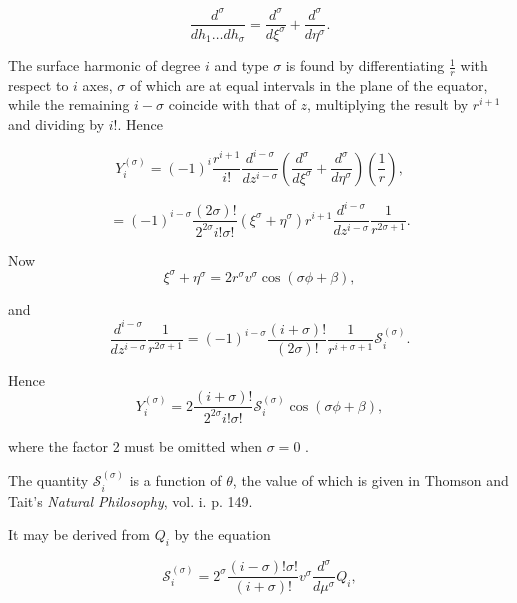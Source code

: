 \documentclass[11pt,a4paper]{article}
\begin{document}
\begin{equation}\tag{32}
\frac{d^\sigma}{dh_1\ldots dh_\sigma}=\frac{d^\sigma}{d\xi^\sigma}+\frac{d^\sigma}{d\eta^\sigma}.
\end{equation}

The surface harmonic of degree $i$ and type $\sigma$ is found by differentiating $\frac{1}{r}$ with respect to $i$ axes, $\sigma$ of which are at equal intervals in the plane of the equator, while the remaining $i-\sigma$ coincide with that of $z$, multiplying the result by $r^{i+1}$ and dividing by $i!$. Hence

\begin{equation}\tag{33}
Y_i^{(\sigma)}=(-1)^i\frac{r^{i+1}}{i!}\frac{d^{i-\sigma}}{dz^{i-\sigma}}
\left(\frac{d^\sigma}{d\xi^\sigma}+\frac{d^\sigma}{d\eta^\sigma}\right)\left(\frac{1}{r}\right),
\end{equation}

\begin{equation}\tag{34}
=(-1)^{i-\sigma}\frac{(2\sigma)!}{2^{2\sigma}i!\sigma!}(\xi^\sigma+\eta^\sigma)r^{i+1}
\frac{d^{i-\sigma}}{dz^{i-\sigma}}\frac{1}{r^{2\sigma+1}}.
\end{equation}

Now 
\begin{equation}\tag{35}
\xi^\sigma+\eta^\sigma=2r^\sigma v^\sigma\cos(\sigma\phi+\beta),
\end{equation}

and 
\begin{equation}\tag{36}
\frac{d^{i-\sigma}}{dz^{i-\sigma}}\frac{1}{r^{2\sigma+1}}
=(-1)^{i-\sigma}\frac{(i+\sigma)!}{(2\sigma)!}\frac{1}{r^{i+\sigma+1}}\mathcal{S}_i^{(\sigma)}.
\end{equation}

Hence 
\begin{equation}\tag{37}
Y_i^{(\sigma)}=2\frac{(i+\sigma)!}{2^{2\sigma}i!\sigma!}\mathcal{S}_i^{(\sigma)}\cos(\sigma\phi+\beta),
\end{equation}

where the factor 2 must be omitted when  $\sigma = 0$ .

The quantity $\mathcal{S}_i^{(\sigma)}$ is a function of $\theta$, the value of which is given in Thomson and Tait's \emph{Natural Philosophy}, vol. i. p. 149.

It may be derived from  $Q_i$  by the equation

\begin{equation}\tag{38}
\mathcal{S}_i^{(\sigma)}=2^\sigma\frac{(i-\sigma)!\sigma!}{(i+\sigma)!}v^\sigma\frac{d^\sigma}{d\mu^\sigma}Q_i,
\end{equation}
\end{document}
